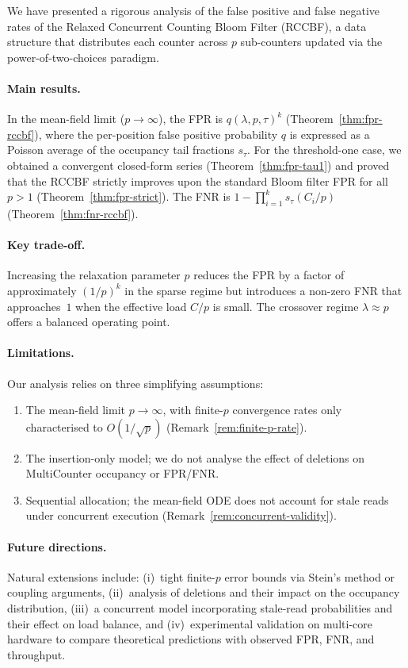 \documentclass[11pt,a4paper]{article}
\newcommand{\RCCBF}{\textsf{RCCBF}}
\begin{document}
We have presented a rigorous analysis of the false positive and false
negative rates of the Relaxed Concurrent Counting Bloom Filter (\RCCBF{}),
a data structure that distributes each counter across $p$ sub-counters
updated via the power-of-two-choices paradigm.

\paragraph{Main results.}
In the mean-field limit ($p \to \infty$), the FPR is
$q(\lambda, p, \tau)^k$ (Theorem~\ref{thm:fpr-rccbf}), where the
per-position false positive probability $q$ is expressed as a Poisson
average of the occupancy tail fractions $s_\tau$.  For the threshold-one
case, we obtained a convergent closed-form series
(Theorem~\ref{thm:fpr-tau1}) and proved that the \RCCBF{} strictly
improves upon the standard Bloom filter FPR for all $p > 1$
(Theorem~\ref{thm:fpr-strict}).  The FNR is
$1 - \prod_{i=1}^{k} s_\tau(C_i/p)$ (Theorem~\ref{thm:fnr-rccbf}).

\paragraph{Key trade-off.}
Increasing the relaxation parameter $p$ reduces the FPR by a factor of
approximately $(1/p)^k$ in the sparse regime but introduces a non-zero FNR
that approaches~$1$ when the effective load $C/p$ is small.  The crossover
regime $\lambda \approx p$ offers a balanced operating point.

\paragraph{Limitations.}
Our analysis relies on three simplifying assumptions:
\begin{enumerate}
  \item The mean-field limit $p \to \infty$, with finite-$p$ convergence
        rates only characterised to $O(1/\sqrt{p})$ (Remark~\ref{rem:finite-p-rate}).
  \item The insertion-only model; we do not analyse the effect of
        deletions on MultiCounter occupancy or FPR/FNR.
  \item Sequential allocation; the mean-field ODE does not account for
        stale reads under concurrent execution
        (Remark~\ref{rem:concurrent-validity}).
\end{enumerate}

\paragraph{Future directions.}
Natural extensions include:
(i)~tight finite-$p$ error bounds via Stein's method or coupling arguments,
(ii)~analysis of deletions and their impact on the occupancy distribution,
(iii)~a concurrent model incorporating stale-read probabilities and their
effect on load balance, and
(iv)~experimental validation on multi-core hardware to compare theoretical
predictions with observed FPR, FNR, and throughput.
\end{document}
